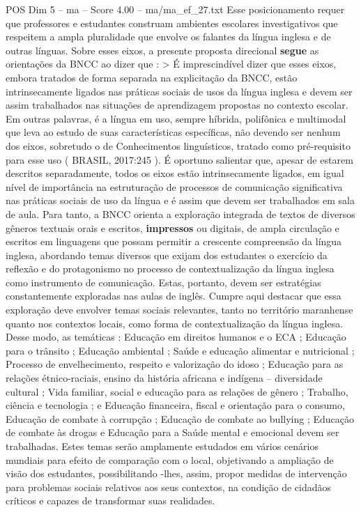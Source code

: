 \begin{textsample}{POS Dim 5 – ma – Score 4.00 – ma/ma\_ef\_27.txt}
Esse posicionamento requer que professores e estudantes construam ambientes escolares investigativos que respeitem a ampla pluralidade que envolve os falantes da língua inglesa e de outras línguas.
Sobre esses eixos, a presente proposta direcional \textbf{segue} as orientações da BNCC ao dizer que : > É imprescindível dizer que esses eixos, embora tratados de forma separada na explicitação da BNCC, estão intrinsecamente ligados nas práticas sociais de usos da língua inglesa e devem ser assim trabalhados nas situações de aprendizagem propostas no contexto escolar.
Em outras palavras, é a língua em uso, sempre híbrida, polifônica e multimodal que leva ao estudo de suas características específicas, não devendo ser nenhum dos eixos, sobretudo o de Conhecimentos linguísticos, tratado como pré-requisito para esse uso ( BRASIL, 2017:245 ).
É oportuno salientar que, apesar de estarem descritos separadamente, todos os eixos estão intrinsecamente ligados, em igual nível de importância na estruturação de processos de comunicação significativa nas práticas sociais de uso da língua e é assim que devem ser trabalhados em sala de aula.
Para tanto, a BNCC orienta a exploração integrada de textos de diversos gêneros textuais orais e escritos, \textbf{impressos} ou digitais, de ampla circulação e escritos em linguagens que possam permitir a crescente compreensão da língua inglesa, abordando temas diversos que exijam dos estudantes o exercício da reflexão e do protagonismo no processo de contextualização da língua inglesa como instrumento de comunicação.
Estas, portanto, devem ser estratégias constantemente exploradas nas aulas de inglês.
Cumpre aqui destacar que essa exploração deve envolver temas sociais relevantes, tanto no território maranhense quanto nos contextos locais, como forma de contextualização da língua inglesa.
Desse modo, as temáticas : Educação em direitos humanos e o ECA ; Educação para o trânsito ; Educação ambiental ; Saúde e educação alimentar e nutricional ; Processo de envelhecimento, respeito e valorização do idoso ; Educação para as relações étnico-raciais, ensino da história africana e indígena – diversidade cultural ; Vida familiar, social e educação para as relações de gênero ; Trabalho, ciência e tecnologia ; e Educação financeira, fiscal e orientação para o consumo, Educação de combate à corrupção ; Educação de combate ao bullying ; Educação de combate às drogas e Educação para a Saúde mental e emocional devem ser trabalhadas.
Estes temas serão amplamente estudados em vários cenários mundiais para efeito de comparação com o local, objetivando a ampliação de visão dos estudantes, possibilitando -lhes, assim, propor medidas de intervenção para problemas sociais relativos aos seus contextos, na condição de cidadãos críticos e capazes de transformar suas realidades.

\end{textsample}
